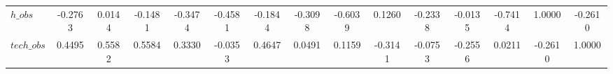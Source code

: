\begin{center}
\begin{longtable}{lcccccccccccccc}
$h\_obs         $	 & 	          -0.2763	 & 	           0.0144	 & 	          -0.1481	 & 	          -0.3474	 & 	          -0.4581	 & 	          -0.1844	 & 	          -0.3098	 & 	          -0.6039	 & 	           0.1260	 & 	          -0.2338	 & 	          -0.0135	 & 	          -0.7414	 & 	           1.0000	 & 	          -0.2610 \\ 
$tech\_obs      $	 & 	           0.4495	 & 	           0.5582	 & 	           0.5584	 & 	           0.3330	 & 	          -0.0353	 & 	           0.4647	 & 	           0.0491	 & 	           0.1159	 & 	          -0.3141	 & 	          -0.0753	 & 	          -0.2556	 & 	           0.0211	 & 	          -0.2610	 & 	           1.0000 \\ 
\end{longtable}
 \end{center}
